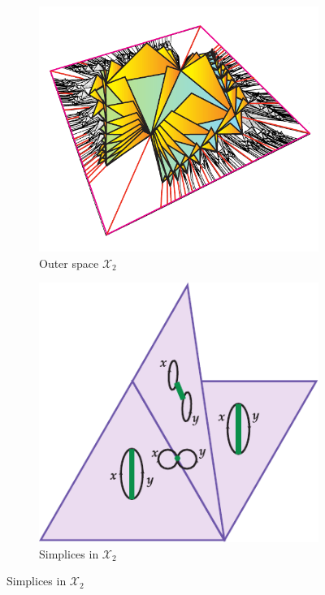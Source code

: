 \begin{figure}[h]
	\centering
	\begin{subfigure}{0.3\textwidth}
		\includegraphics[width=\textwidth]{./Images/outerSpaceD2.pdf}
		\caption{Outer space $\mathcal{X}_{2}$}
	\end{subfigure}
	\hspace{0.1\textwidth}
	\begin{subfigure}{0.3\textwidth}
		\includegraphics[width=\textwidth]{./Images/outerSpaceFaces.pdf}
		\caption{Simplices in $\mathcal{X}_{2}$}
	\end{subfigure}
\end{figure}

